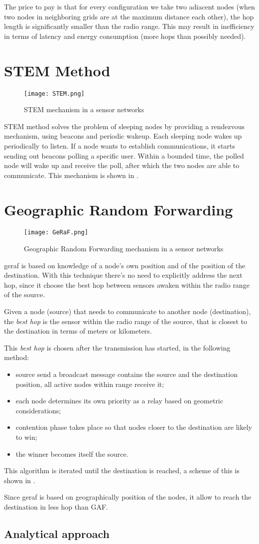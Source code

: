 The price to pay is that for every configuration we take two adiacent nodes (when two nodes in neighboring grids are at the maximum distance each other), the hop length is significantly smaller than the radio range. This may result in inefficiency in terms of latency and energy consumption (more hops than possibly needed).

\section{STEM Method}
\begin{figure}[h]
	\centering
	\texttt{[image: STEM.png]}
	\caption{STEM mechanism in a sensor networks}
	\label{fig:STEM}
\end{figure}
STEM method solves the problem of sleeping nodes by providing a rendezvous mechanism, using beacons and periodic wakeup.
Each sleeping node wakes up periodically to listen. If a node wants to establish communications, it starts sending out beacons polling a specific user. Within a bounded time, the polled node will wake up and receive the poll, after which the two nodes are able to communicate. This mechanism is shown in .

\section{Geographic Random Forwarding}
\begin{figure}[h]
	\centering
	\texttt{[image: GeRaF.png]}
	\caption{Geographic Random Forwarding mechanism in a sensor networks}
	\label{fig:GeRaF}
\end{figure}
\gls{geraf} is based on knowledge of a node’s own position and of the position of the destination.
With this technique there's no need to explicitly address the next hop, since it choose the best hop between sensors awaken within the radio range of the source.

Given a node (source) that needs to communicate to another node (destination), the \textit{best hop} is the sensor within the radio range of the source, that is closest to the destination in terms of meters or kilometers.

This \textit{best hop} is chosen after the transmission has started, in the following method:
\begin{itemize}
	\item source send a broadcast message contains the source and the destination position, all active nodes within range receive it;
	\item each node determines its own priority as a relay based on geometric considerations;
	\item contention phase takes place so that nodes closer to the destination are likely to win;
	\item the winner becomes itself the source.
\end{itemize}

This algorithm is iterated until the destination is reached, a scheme of this is shown in .

Since \gls{geraf} is based on geographically position of the nodes, it allow to reach the destination in less hop than GAF.

\subsection{Analytical approach}
